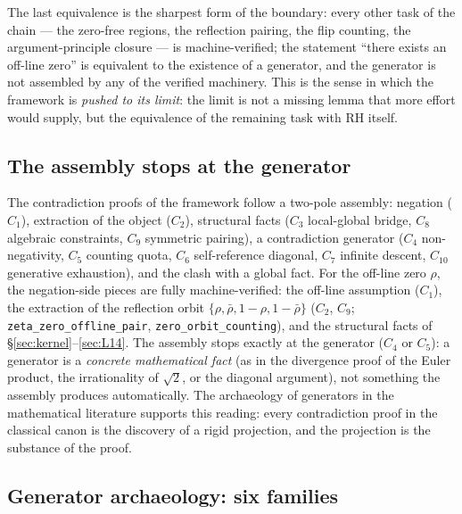 \documentclass{article}
\begin{document}
The last equivalence is the sharpest form of the boundary: every other
task of the chain --- the zero-free regions, the reflection pairing, the
flip counting, the argument-principle closure --- is machine-verified;
the statement ``there exists an off-line zero'' is equivalent to the
existence of a generator, and the generator is not assembled by any of
the verified machinery. This is the sense in which the framework is
\emph{pushed to its limit}: the limit is not a missing lemma that more
effort would supply, but the equivalence of the remaining task with RH
itself.

\subsection{The assembly stops at the generator}
\label{sec:partIII:gen}

The contradiction proofs of the framework follow a two-pole assembly:
negation ($C_1$), extraction of the object ($C_2$), structural facts
($C_3$ local-global bridge, $C_8$ algebraic constraints, $C_9$ symmetric
pairing), a contradiction generator ($C_4$ non-negativity,
$C_5$ counting quota, $C_6$ self-reference diagonal, $C_7$ infinite
descent, $C_{10}$ generative exhaustion), and the clash with a global
fact. For the off-line zero $\rho$, the negation-side pieces are fully
machine-verified: the off-line assumption ($C_1$), the extraction of the
reflection orbit $\{\rho,\bar\rho,1-\rho,1-\bar\rho\}$ ($C_2$, $C_9$;
\texttt{zeta\_zero\_offline\_pair}, \texttt{zero\_orbit\_counting}), and
the structural facts of \S\ref{sec:kernel}--\ref{sec:L14}. The assembly
stops exactly at the generator ($C_4$ or $C_5$): a generator is a
\emph{concrete mathematical fact} (as in the divergence proof of the
Euler product, the irrationality of $\sqrt2$, or the diagonal argument),
not something the assembly produces automatically. The archaeology of
generators in the mathematical literature supports this reading: every
contradiction proof in the classical canon is the discovery of a rigid
projection, and the projection is the substance of the proof.

\subsection{Generator archaeology: six families}
\label{sec:partIII:arch}
\end{document}
